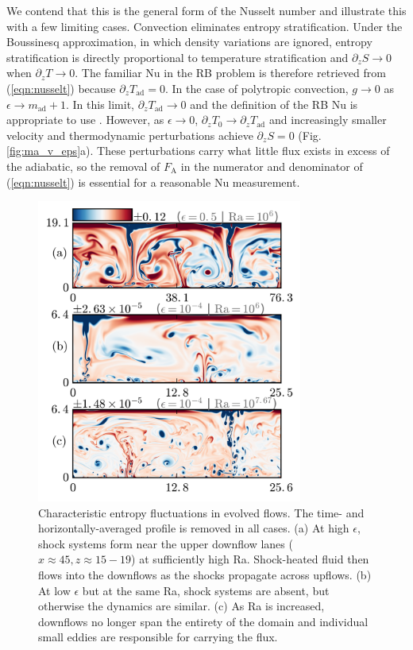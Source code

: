 \documentclass[aps, prl, twocolumn, nofootinbib, groupedaddress, amsfonts, amssymb, amsmath]{revtex4-1}
\begin{document}
We contend that this is the general form of the Nusselt number
and illustrate this with a few limiting
cases. Convection eliminates
entropy stratification.  Under the Boussinesq approximation,
in which density variations are ignored, entropy stratification 
is directly proportional to temperature stratification
and $\partial_z S \rightarrow 0$ when $\partial_z T \rightarrow 0$.  
The familiar Nu in the RB problem is
therefore retrieved from (\ref{eqn:nusselt}) because $\partial_z T_{\text{ad}} = 0$.  
In the case of polytropic convection,  $g \rightarrow 0$
as $\epsilon \rightarrow m_{\text{ad}} + 1$.
In this limit, $\partial_z T_{\text{ad}} \rightarrow 0$ and the
definition of the RB Nu is appropriate to use \cite{brandenburg&all2005}. 
However, as $\epsilon \rightarrow 0$, 
$\partial_z T_{0}\rightarrow \partial_z T_{\text{ad}}$ and increasingly
smaller velocity and thermodynamic perturbations 
achieve $\partial_z S = 0$ (Fig. \ref{fig:ma_v_eps}a).
These perturbations carry what little flux exists in 
excess of the adiabatic, so the removal of 
$F_{\text{A}}$ in the numerator and denominator of 
(\ref{eqn:nusselt}) is essential for a reasonable Nu measurement.

\begin{figure}[b]
\includegraphics[width=3.4375in]{./figs/snapshots_fig.png}
\caption{Characteristic entropy fluctuations in evolved flows. 
The time- and horizontally-averaged profile is removed in all cases.  (a) At high
$\epsilon$, shock systems form near the upper downflow lanes ($x \approx 45, z \approx 15-19$)
at sufficiently high Ra.
Shock-heated fluid then flows into the downflows as the shocks propagate across upflows.
(b) At low $\epsilon$ but at the same Ra, shock systems are absent, 
but otherwise the dynamics are similar.  (c) As Ra is increased, downflows no longer span
the entirety of the domain and individual small eddies are responsible for carrying the flux.
\label{fig:entropy_snapshots} }
\end{figure}
\end{document}
